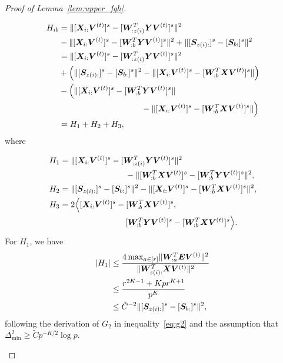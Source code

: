 \documentclass[journal]{IEEEtran}
\theoremstyle{definition}
\theoremstyle{definition}
\newcommand{\of}[1]{\left(#1\right)}
\begin{document}
\begin{proof}[Proof of Lemma~\ref{lem:upper_fgh}]
\begin{enumerate}[wide]
    \vspace{-0.5cm}
    \small
    \begin{align}
        H_{ib} &= \onormSize{}{ [\mX_{i:} \mV^{(t)}]^s -  [  \mW_{:z(i)}^T \mY \mV^{(t)} ]^s}^2 \\
        & - \onormSize{}{ [\mX_{i:} \mV^{(t)}]^s -  [  \mW_{:b}^T \mY \mV^{(t)} ]^s}^2 + \onormSize{}{ [ \mS_{z(i):}  ]^s - [ \mS_{b:}  ]^s  }^2 \\
        & =  \onormSize{}{ [ \mX_{i:} \mV^{(t)}]^s -  [  \mW_{:z(i)}^T \mY \mV^{(t)} ]^s}^2 \\
        &  + \of{ \onormSize{}{ [ \mS_{z(i):}  ]^s - [ \mS_{b:}  ]^s  }^2 - \onormSize{}{ [\mX_{i:} \mV^{(t)}]^s-  [  \mW_{:b}^T \mX \mV^{(t)} ]^s }  } \\
        &  - \Big(\onormSize{}{ [\mX_{i:} \mV^{(t)}]^s-  [  \mW_{:b}^T \mY \mV^{(t)} ]^s } \\
        & \quad \quad \quad \quad \quad \quad \quad \quad \quad \quad -  \onormSize{}{ [\mX_{i:} \mV^{(t)}]^s-  [  \mW_{:b}^T \mX \mV^{(t)} ]^s }   \Big) \\
        & = H_1 + H_2 + H_3,
    \end{align}
    \normalsize
    where 
    
    \vspace{-0.5cm}
    \small
    \begin{align}
        H_1 &= \lVert [ \bm X_{i:} \bm{V}^{(t)}]^s -  [  \bm{W}_{:z(i)}^T \bm Y \bm{V}^{(t)} ]^s\rVert^2 \\
        & \quad \quad \quad \quad \quad  \quad \quad \quad - \lVert [ \bm{W}_{:b}^T \bm X \bm{V}^{(t)}]^s -  [ \bm{W}_{:b}^T \bm Y \bm{V}^{(t)}]^s\rVert^2, \\
        H_2 &=  \lVert [ \bm S_{z(i):}  ]^s - [ \bm S_{b:}  ]^s  \rVert^2 - \lVert [\bm X_{i:} \bm{V}^{(t)}]^s-  [  \bm{W}_{:b}^T \bm X \bm{V}^{(t)} ]^s \rVert^2  , \\
        H_3 & = 2 \Big\langle [\bm X_{i:} \bm{V}^{(t)}]^s  -  [  \bm{W}_{:b}^T \bm X \bm{V}^{(t)} ]^s, \\
        &  \quad \quad \quad \quad \quad  \quad \quad \quad [  \bm{W}_{:b}^T \bm Y \bm{V}^{(t)} ]^s -  [  \bm{W}_{:b}^T \bm X \bm{V}^{(t)} ]^s \Big\rangle.
    \end{align}
    \normalsize
    For $H_1$, we have 
    \begin{align}
        |H_1| &\leq  \frac{4 \max_{a \in [r]}\onormSize{}{ \mW_{:a}^T \mE \mV^{(t)} }^2 }{ \onormSize{}{ \mW_{z(i):}^T\mX \mV^{(t)}}^2}\\
        &\leq  \frac{ r^{2K-1} + K p r^{K+1} }{p^{K}} \\
        &\leq \tilde C^{-2} \onormSize{}{ [ \mS_{z(i):}  ]^s - [ \mS_{b:}  ]^s  }^2\label{eq:h1},
    \end{align}
    following the derivation of $G_2$ in inequality~\eqref{eq:g2} and the assumption that $\Delta_{\min}^2 \geq \tilde C p^{-K/2} \log p$.


\end{enumerate}
\end{proof}
\end{document}
